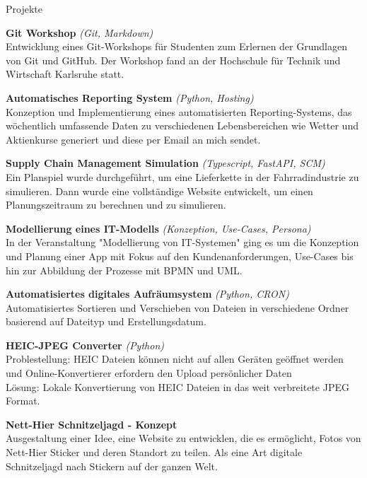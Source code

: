 \documentclass{resume} %
\begin{document}
\begin{rSection}{Projekte}
    \item \textbf{Git Workshop} \textit{(Git, Markdown)}\\
    {Entwicklung eines Git-Workshops für Studenten zum Erlernen der Grundlagen von Git und GitHub.
    Der Workshop fand an der Hochschule für Technik und Wirtschaft Karlsruhe statt.}

    \item \textbf{Automatisches Reporting System} \textit{(Python, Hosting)}\\
    {Konzeption und Implementierung eines automatisierten Reporting-Systems, das wöchentlich umfassende Daten zu verschiedenen Lebensbereichen wie Wetter und Aktienkurse generiert und diese per Email an mich sendet.}
    
    \item \textbf{Supply Chain Management Simulation} \textit{(Typescript, FastAPI, SCM)}\\ 
    {Ein Planspiel wurde durchgeführt, um eine Lieferkette in der Fahrradindustrie zu simulieren. Dann wurde eine vollständige Website entwickelt, um einen Planungszeitraum zu berechnen und zu simulieren.}
    
    \item \textbf{Modellierung eines IT-Modells} \textit{(Konzeption, Use-Cases, Persona)}\\ 
    {In der Veranstaltung "Modellierung von IT-Systemen" ging es um die Konzeption und Planung einer App mit Fokus auf den Kundenanforderungen, Use-Cases bis hin zur Abbildung der Prozesse mit BPMN und UML.}
    
    \item \textbf{Automatisiertes digitales Aufräumsystem} \textit{(Python, CRON)}\\
    {Automatisiertes Sortieren und Verschieben von Dateien in verschiedene Ordner basierend auf Dateityp und Erstellungsdatum.}
    
    \item \textbf{HEIC-JPEG Converter} \textit{(Python)}\\
    {Problestellung: HEIC Dateien können nicht auf allen Geräten geöffnet werden und Online-Konvertierer erfordern den Upload persönlicher Daten \\
    Lösung: Lokale Konvertierung von HEIC Dateien in das weit verbreitete JPEG Format.}
    
    \item \textbf{Nett-Hier Schnitzeljagd - Konzept}\\
    {Ausgestaltung einer Idee, eine Website zu entwicklen, die es ermöglicht, Fotos von Nett-Hier Sticker und deren Standort zu teilen. Als eine Art digitale Schnitzeljagd nach Stickern auf der ganzen Welt.}
\end{rSection}
\end{document}
